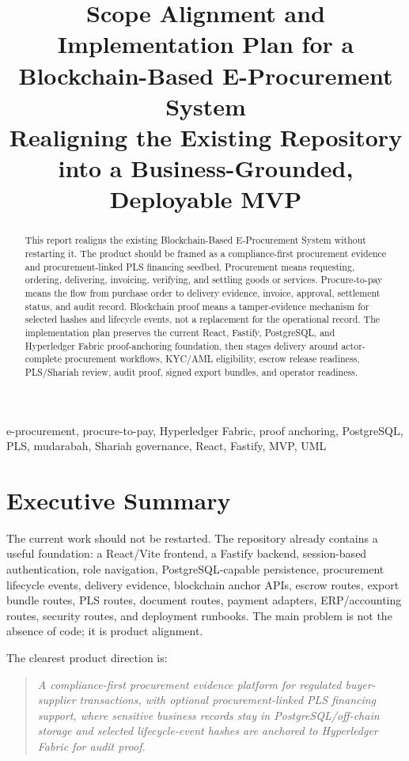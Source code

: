 \documentclass[conference]{IEEEtran}
\title{Scope Alignment and Implementation Plan for a Blockchain-Based E-Procurement System\\
\large Realigning the Existing Repository into a Business-Grounded, Deployable MVP}
\author{\IEEEauthorblockN{Prepared for Product, Engineering, QA, and Supervisor Review}
\IEEEauthorblockA{Repository: \repo\\ Date: 30 May 2026}}
\begin{document}
\maketitle

\begin{abstract}
This report realigns the existing Blockchain-Based E-Procurement System without restarting it. The product should be framed as a compliance-first procurement evidence and procurement-linked PLS financing seedbed. Procurement means requesting, ordering, delivering, invoicing, verifying, and settling goods or services. Procure-to-pay means the flow from purchase order to delivery evidence, invoice, approval, settlement status, and audit record. Blockchain proof means a tamper-evidence mechanism for selected hashes and lifecycle events, not a replacement for the operational record. The implementation plan preserves the current React, Fastify, PostgreSQL, and Hyperledger Fabric proof-anchoring foundation, then stages delivery around actor-complete procurement workflows, KYC/AML eligibility, escrow release readiness, PLS/Shariah review, audit proof, signed export bundles, and operator readiness.
\end{abstract}

\begin{IEEEkeywords}
e-procurement, procure-to-pay, Hyperledger Fabric, proof anchoring, PostgreSQL, PLS, mudarabah, Shariah governance, React, Fastify, MVP, UML
\end{IEEEkeywords}

\section{Executive Summary}
The current work should not be restarted. The repository already contains a useful foundation: a React/Vite frontend, a Fastify backend, session-based authentication, role navigation, PostgreSQL-capable persistence, procurement lifecycle events, delivery evidence, blockchain anchor APIs, escrow routes, export bundle routes, PLS routes, document routes, payment adapters, ERP/accounting routes, security routes, and deployment runbooks. The main problem is not the absence of code; it is product alignment.

The clearest product direction is:
\begin{quote}\itshape
A compliance-first procurement evidence platform for regulated buyer-supplier transactions, with optional procurement-linked PLS financing support, where sensitive business records stay in PostgreSQL/off-chain storage and selected lifecycle-event hashes are anchored to Hyperledger Fabric for audit proof.
\end{quote}
\end{document}
